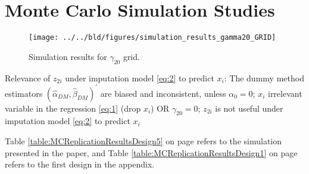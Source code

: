\section{Monte Carlo Simulation Studies}

\begin{figure}
    \centering
    \texttt{[image: ../../bld/figures/simulation\_results\_gamma20\_GRID]}
    \caption{Simulation results for $\gamma_{20}$ grid.}
    \label{fig:gamma20_grid}
\end{figure}

Relevance of $z_{2i}$ under imputation model \eqref{eq:2} to predict $x_i$:
The dummy method estimators $(\hat{\alpha}_{DM}, \hat{\beta}_{DM})^{\prime}$ are biased and inconsistent, unless
$\alpha_0 = 0$; $x_i$ irrelevant variable in the regression \eqref{eq:1} (drop $x_i$)
OR
$\gamma_{20} = 0$; $z_{2i}$ is not useful under imputation model \eqref{eq:2} to predict $x_i$







Table \ref{table:MCReplicationResultsDesign5} on page \pageref{table:MCReplicationResultsDesign5} refers
to the simulation presented in the paper, and Table \ref{table:MCReplicationResultsDesign1} on page \pageref{table:MCReplicationResultsDesign1}
refers to the first design in the appendix.
